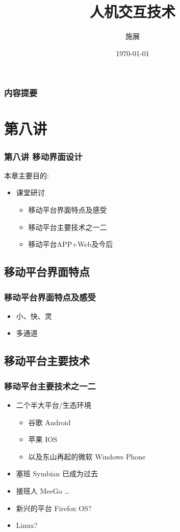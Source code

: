 \documentclass{beamer}
\title{人机交互技术}
\author{施展}
\institute{华中科技大学~武汉光电国家实验室}
\date{\today}
\begin{document}
\begin{frame}
	\titlepage
\end{frame}

\begin{frame}
	\frametitle{内容提要}
	\tableofcontents
\end{frame}

\section{第八讲}
\begin{frame}
	\frametitle{第八讲 移动界面设计}
	本章主要目的:
	\begin{itemize}
		\item 课堂研讨
		\begin{itemize}
			\item 移动平台界面特点及感受
			\item 移动平台主要技术之一二
			\item 移动平台APP+Web及今后
		\end{itemize}
	\end{itemize}
\end{frame}

\subsection{移动平台界面特点}
\begin{frame}
	\frametitle{移动平台界面特点及感受}
	\begin{itemize}[<+->]
		\item 小、快、灵
		\item 多通道
	\end{itemize}
\end{frame}

\subsection{移动平台主要技术}
\begin{frame}
	\frametitle{移动平台主要技术之一二}
	\begin{itemize}[<+->]
		\item 二个半大平台/生态环境
		\begin{itemize}
			\item 谷歌 Android
			\item 苹果 IOS
			\item 以及东山再起的微软 Windows Phone
		\end{itemize}
		\item 塞班 Symbian 已成为过去
		\item 接班人 MeeGo \dots
		\item 新兴的平台 Firefox OS?
		\item Linux?
	\end{itemize}
\end{frame}
\end{document}

